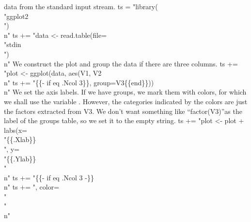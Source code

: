 data from the standard input stream.
\nwenddocs{}\endmoddef\nwstartdeflinemarkup{}\nwenddeflinemarkup
ts = "library(\\"ggplot2\\")\\n"
ts += "data <- read.table(file=\\"stdin\\")\\n"
\nwendcode{}\nwdocspar
We construct the plot and group the data if there are three columns.
\nwenddocs{}\endmoddef\nwstartdeflinemarkup{}\nwenddeflinemarkup
ts += "plot <- ggplot(data, aes(V1, V2\\n"
ts += "\{\{- if eq .Ncol 3\}\}, group=V3\{\{end\}\}))\\n"
\nwendcode{}\nwdocspar
We set the axis labels. If we have groups, we mark them with colors,
for which we shall use the variable . However, the
categories indicated by the colors are just the factors extracted from
V3. We don't want something like ``factor(V3)''as the label of the
groups table, so we set it to the empty string.
\nwenddocs{}\endmoddef\nwstartdeflinemarkup{}\nwenddeflinemarkup
ts += "plot <- plot + labs(x=\\"\{\{.Xlab\}\}\\", y=\\"\{\{.Ylab\}\}\\"\\n"
ts += "\{\{- if eq .Ncol 3 -\}\}\\n"
ts += ", color=\\"\\"\\n"
